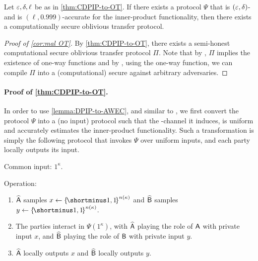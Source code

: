 \begin{corollary}\label{cor:mal OT}
   Let $\varepsilon,\delta,\ell$ be as in \cref{thm:CDPIP-to-OT}. If there exists a protocol $\Psi$ that is $(\varepsilon,\delta)$-\CDP  and is $(\ell,0.999)$-accurate for the inner-product functionality, then there exists a computationally secure oblivious transfer protocol. 
\end{corollary}
\begin{proof}[Proof of \cref{cor:mal OT}]
By \cref{thm:CDPIP-to-OT}, there exists a semi-honest computational secure oblivious transfer protocol $\Pi$. Note that by \cite{ImpagliazzoLu89}, $\Pi$ implies the existence of one-way functions and by \cite{GoldreichMW87}, using the one-way function, we can compile $\Pi$ into a (computational) \OT secure against arbitrary adversaries.
\end{proof}


\paragraph{Proof of \cref{thm:CDPIP-to-OT}.}

 In order to use \cref{lemma:DPIP-to-AWEC}, and similar to \cite{HaitnerMST22}, we first convert the protocol $\Psi$ into a (no input) protocol such that the \CDP-channel it induces, is uniform and accurately estimates the inner-product functionality. Such a transformation is simply the following protocol that invokes $\Psi$ over uniform inputs, and each party locally outputs its input. 
\begin{protocol}[$\hPsi^{\Psi} = (\hAc,\hBc)$]\label{prot:EDPtoSV}
	\item Common input: $1^\kappa$.
	\item Operation:
	\begin{enumerate}
		
		\item $\widehat{\mathsf{A}}$ samples $x \gets \oo^{\pn(\kappa)}$ and $\widehat{\mathsf{B}}$ samples $y\gets \oo^{\pn(\kappa)}$. 
		
		\item The parties interact in $\Psi(1^\kappa)$, with $\widehat{\mathsf{A}}$ playing the role of $\mathsf{A}$ with private input $x$, and $\widehat{\mathsf{B}}$ playing the role of $\mathsf{B}$ with private input $y$.
		
		\item $\widehat{\mathsf{A}}$ locally outputs $x$ and $\widehat{\mathsf{B}}$ locally outputs $y$. 
	\end{enumerate}
\end{protocol}

